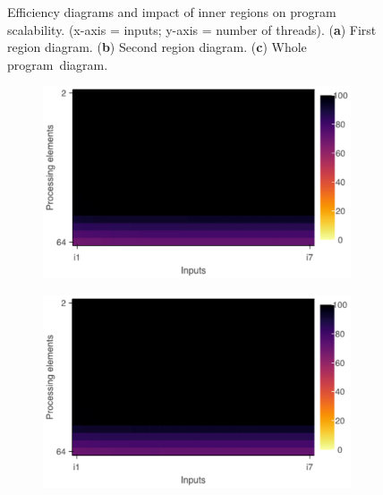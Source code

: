 \begin{figure}[H]
\begin{subfigure}[b]{0.45\textwidth}
		\label{fig:pv_regionscomparison_c}
	\end{subfigure}
	\caption{Efficiency diagrams and impact of inner regions on program scalability. (x-axis = inputs; y-axis = number of threads). (\textbf{a}) First region diagram. (\textbf{b}) Second region diagram. (\textbf{c}) Whole program~diagram.}
	\label{fig:pv_regionscomparison}
\end{figure}
\unskip
\begin{figure}[H]
	\begin{subfigure}[b]{0.45\textwidth}
		\includegraphics[width=\textwidth]{pascalanalyzer/figures/results/efficiency_rg_1.pdf}
		\label{fig:pv_regionscomparison_a_2}
	\end{subfigure}
	\begin{subfigure}[b]{0.45\textwidth}
		\includegraphics[width=\textwidth]{pascalanalyzer/figures/results/efficiency_rg_2.pdf}
		\label{fig:pv_regionscomparison_b_2}

\end{subfigure}
\end{figure}
